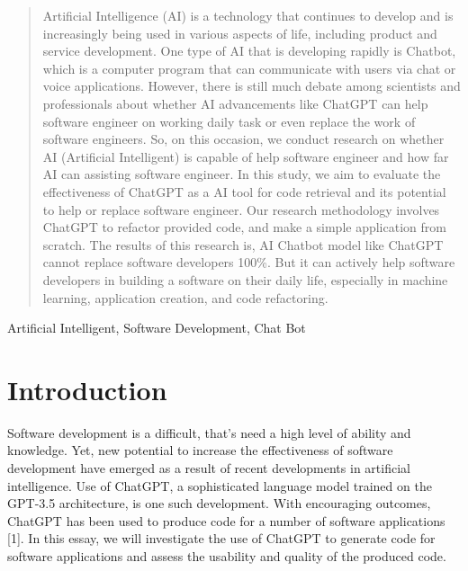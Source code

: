 \documentclass[conference]{IEEEtran}
\begin{document}
\maketitle

\begin{abstract}
Artificial Intelligence (AI) is a technology that continues to develop and is increasingly being used in various aspects of life, including product and service development.  One type of AI that is developing rapidly is Chatbot, which is a computer program that can communicate with users via chat or voice applications.  However, there is still much debate among scientists and professionals about whether AI advancements like ChatGPT can help software engineer on working  daily task or even replace the work of software engineers.  So, on this occasion, we conduct research on whether AI (Artificial Intelligent) is capable of help software engineer and how far AI can assisting software engineer. In this study, we aim to evaluate the effectiveness of ChatGPT as a AI tool for code retrieval and its potential to help or replace software engineer. Our research methodology involves ChatGPT to refactor provided code, and make a simple application from scratch. The results of this research is, AI Chatbot model like ChatGPT cannot replace software developers 100\%. But it can actively help software developers in building a software on their daily life, especially in machine learning, application creation, and code refactoring.
\end{abstract}

\begin{IEEEkeywords}
Artificial Intelligent, Software Development, Chat Bot
\end{IEEEkeywords}

\section{Introduction}
Software development is a difficult, that's need a high level of ability and knowledge. Yet, new potential to increase the effectiveness of software development have emerged as a result of recent developments in artificial intelligence. Use of ChatGPT, a sophisticated language model trained on the GPT-3.5 architecture, is one such development. With encouraging outcomes, ChatGPT has been used to produce code for a number of software applications [1]. In this essay, we will investigate the use of ChatGPT to generate code for software applications and assess the usability and quality of the produced code.
\end{document}
